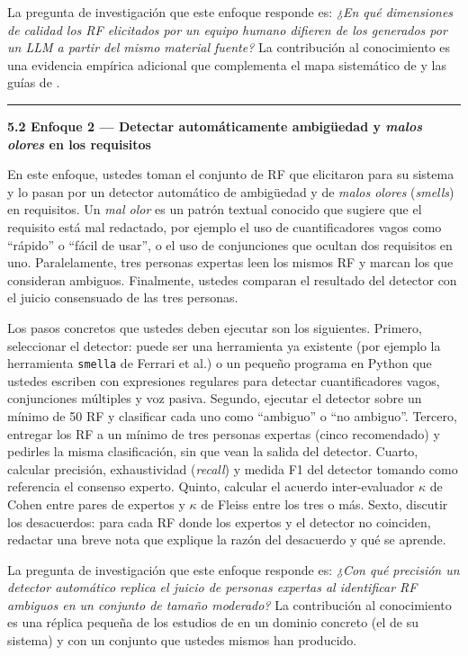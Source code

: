 \documentclass[11pt,a4paper]{article}
\newcommand{\submark}[1]{\par\vspace{4pt}\noindent
    {\color{uteqgreen}\rule[-1pt]{3.5pt}{12pt}}\hspace{6pt}\textbf{\color{uteqgreen}#1}\par\vspace{2pt}}
\begin{document}
La pregunta de investigación que este enfoque responde es: \emph{¿En qué dimensiones de calidad los RF elicitados por un equipo humano difieren de los generados por un LLM a partir del mismo material fuente?}
La contribución al conocimiento es una evidencia empírica adicional que complementa el mapa sistemático de \cite{cheng2026genai} y las guías de \cite{vogelsang2024llm}.

\submark{5.2 Enfoque 2 --- Detectar automáticamente ambigüedad y \emph{malos olores} en los requisitos}
En este enfoque, ustedes toman el conjunto de RF que elicitaron para su sistema y lo pasan por un detector automático de ambigüedad y de \emph{malos olores} (\emph{smells}) en requisitos.
Un \emph{mal olor} es un patrón textual conocido que sugiere que el requisito está mal redactado, por ejemplo el uso de cuantificadores vagos como ``rápido'' o ``fácil de usar'', o el uso de conjunciones que ocultan dos requisitos en uno.
Paralelamente, tres personas expertas leen los mismos RF y marcan los que consideran ambiguos.
Finalmente, ustedes comparan el resultado del detector con el juicio consensuado de las tres personas.

Los pasos concretos que ustedes deben ejecutar son los siguientes.
Primero, seleccionar el detector: puede ser una herramienta ya existente (por ejemplo la herramienta \texttt{smella} de Ferrari et al.) o un pequeño programa en Python que ustedes escriben con expresiones regulares para detectar cuantificadores vagos, conjunciones múltiples y voz pasiva.
Segundo, ejecutar el detector sobre un mínimo de 50 RF y clasificar cada uno como ``ambiguo'' o ``no ambiguo''.
Tercero, entregar los RF a un mínimo de tres personas expertas (cinco recomendado) y pedirles la misma clasificación, sin que vean la salida del detector.
Cuarto, calcular precisión, exhaustividad (\emph{recall}) y medida F1 del detector tomando como referencia el consenso experto.
Quinto, calcular el acuerdo inter-evaluador $\kappa$ de Cohen \cite{cohen1960kappa} entre pares de expertos y $\kappa$ de Fleiss \cite{fleiss1971kappa} entre los tres o más.
Sexto, discutir los desacuerdos: para cada RF donde los expertos y el detector no coinciden, redactar una breve nota que explique la razón del desacuerdo y qué se aprende.

La pregunta de investigación que este enfoque responde es: \emph{¿Con qué precisión un detector automático replica el juicio de personas expertas al identificar RF ambiguos en un conjunto de tamaño moderado?}
La contribución al conocimiento es una réplica pequeña de los estudios de \cite{ferrari2018detecting,fischbach2023automatic} en un dominio concreto (el de su sistema) y con un conjunto que ustedes mismos han producido.
\end{document}
